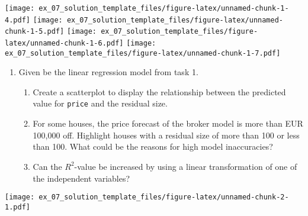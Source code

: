 \documentclass[11pt,]{article}
\newenvironment{Shaded}{\begin{snugshade}}{\end{snugshade}}
\newcommand{\CommentTok}[1]{\textcolor[rgb]{0.56,0.35,0.01}{\textit{#1}}}
\newcommand{\DataTypeTok}[1]{\textcolor[rgb]{0.13,0.29,0.53}{#1}}
\newcommand{\DecValTok}[1]{\textcolor[rgb]{0.00,0.00,0.81}{#1}}
\newcommand{\KeywordTok}[1]{\textcolor[rgb]{0.13,0.29,0.53}{\textbf{#1}}}
\newcommand{\NormalTok}[1]{#1}
\newcommand{\OperatorTok}[1]{\textcolor[rgb]{0.81,0.36,0.00}{\textbf{#1}}}
\newcommand{\StringTok}[1]{\textcolor[rgb]{0.31,0.60,0.02}{#1}}
\providecommand{\tightlist}{%
  \setlength{\itemsep}{0pt}\setlength{\parskip}{0pt}}
\begin{document}
\texttt{[image: ex\_07\_solution\_template\_files/figure-latex/unnamed-chunk-1-4.pdf]}
\texttt{[image: ex\_07\_solution\_template\_files/figure-latex/unnamed-chunk-1-5.pdf]}
\texttt{[image: ex\_07\_solution\_template\_files/figure-latex/unnamed-chunk-1-6.pdf]}
\texttt{[image: ex\_07\_solution\_template\_files/figure-latex/unnamed-chunk-1-7.pdf]}

\begin{enumerate}
\def\labelenumi{\arabic{enumi}.}
\setcounter{enumi}{1}
\tightlist
\item
  Given be the linear regression model from task 1.

  \begin{enumerate}
  \def\labelenumii{\alph{enumii})}
  \tightlist
  \item
    Create a scatterplot to display the relationship between the
    predicted value for \texttt{price} and the residual size.
  \item
    For some houses, the price forecast of the broker model is more than
    EUR 100,000 off. Highlight houses with a residual size of more than
    100 or less than 100. What could be the reasons for high model
    inaccuracies?
  \item
    Can the \(R^2\)-value be increased by using a linear transformation
    of one of the independent variables?
  \end{enumerate}
\end{enumerate}

\begin{Shaded}
\end{Shaded}

\texttt{[image: ex\_07\_solution\_template\_files/figure-latex/unnamed-chunk-2-1.pdf]}
\end{document}
